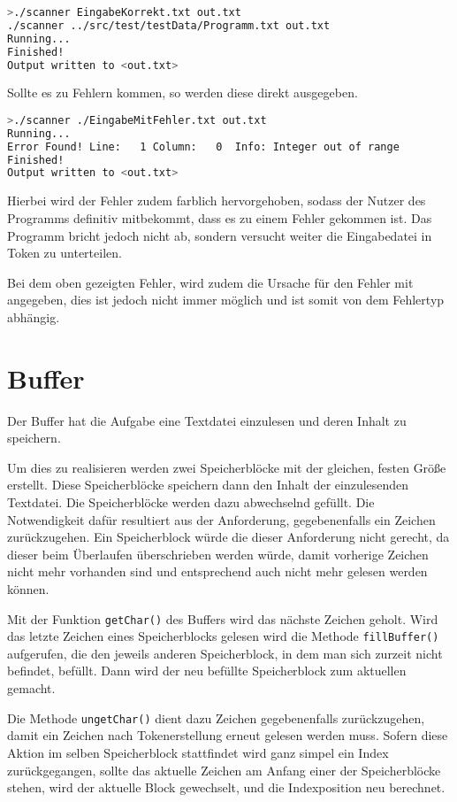 \begin{lstlisting}[language=bash,numbers=none]
>./scanner EingabeKorrekt.txt out.txt
./scanner ../src/test/testData/Programm.txt out.txt
Running...
Finished!
Output written to <out.txt>
\end{lstlisting}

Sollte es zu Fehlern kommen, so werden diese direkt ausgegeben.
\begin{lstlisting}[language=bash,numbers=none]
>./scanner ./EingabeMitFehler.txt out.txt
Running...
Error Found! Line:   1 Column:   0  Info: Integer out of range
Finished!
Output written to <out.txt>
\end{lstlisting}

Hierbei wird der Fehler zudem farblich hervorgehoben, sodass der Nutzer des Programms definitiv mitbekommt, dass es zu einem Fehler gekommen ist. Das Programm bricht jedoch nicht ab, sondern versucht weiter die Eingabedatei in Token zu unterteilen.

Bei dem oben gezeigten Fehler, wird zudem die Ursache für den Fehler mit angegeben, dies ist jedoch nicht immer möglich und ist somit von dem Fehlertyp abhängig.

\section{Buffer}
Der Buffer hat die Aufgabe eine Textdatei einzulesen und deren Inhalt zu speichern.

Um dies zu realisieren werden zwei Speicherblöcke mit der gleichen, festen Größe erstellt. Diese Speicherblöcke speichern dann den Inhalt der einzulesenden Textdatei. Die Speicherblöcke werden dazu abwechselnd gefüllt. Die Notwendigkeit dafür resultiert aus der Anforderung, gegebenenfalls ein Zeichen zurückzugehen. Ein Speicherblock würde die dieser Anforderung nicht gerecht, da dieser beim Überlaufen überschrieben werden würde, damit vorherige Zeichen nicht mehr vorhanden sind und entsprechend auch nicht mehr gelesen werden können.

Mit der Funktion \texttt{getChar()} des Buffers wird das nächste Zeichen geholt. Wird das letzte Zeichen eines Speicherblocks gelesen wird die Methode \texttt{fillBuffer()} aufgerufen, die den jeweils anderen Speicherblock, in dem man sich zurzeit nicht befindet, befüllt. Dann wird der neu befüllte Speicherblock zum aktuellen gemacht.

Die Methode \texttt{ungetChar()} dient dazu Zeichen gegebenenfalls zurückzugehen, damit ein Zeichen nach Tokenerstellung erneut gelesen werden muss. Sofern diese Aktion im selben Speicherblock stattfindet wird ganz simpel ein Index zurückgegangen, sollte das aktuelle Zeichen am Anfang einer der Speicherblöcke stehen, wird der aktuelle Block gewechselt, und die Indexposition neu berechnet.

